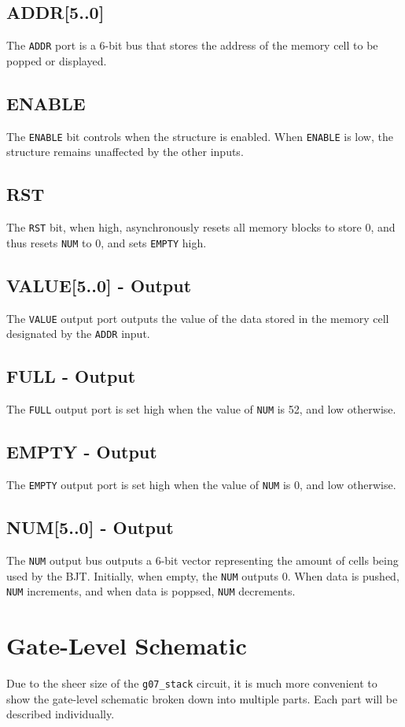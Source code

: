 \documentclass[12pt]{report}
\begin{document}
\section*{ADDR[5..0]}
The \texttt{ADDR} port is a 6-bit bus that stores the address of the memory cell to be popped or
displayed.
\section*{ENABLE}
The \texttt{ENABLE} bit controls when the structure is enabled. When \texttt{ENABLE} is low, the
structure remains unaffected by the other inputs.
\section*{RST}
The \texttt{RST} bit, when high, asynchronously resets all memory blocks to store 0, and thus resets
\texttt{NUM} to 0, and sets \texttt{EMPTY} high.
\section*{VALUE[5..0] - Output}
The \texttt{VALUE} output port outputs the value of the data stored in the memory cell designated by
the \texttt{ADDR} input.
\section*{FULL - Output}
The \texttt{FULL} output port is set high when the value of \texttt{NUM} is 52, and low otherwise.
\section*{EMPTY - Output}
The \texttt{EMPTY} output port is set high when the value of \texttt{NUM} is 0, and low otherwise.
\section*{NUM[5..0] - Output}
The \texttt{NUM} output bus outputs a 6-bit vector representing the amount of cells being used by
the BJT. Initially, when empty, the \texttt{NUM} outputs 0. When data is pushed, \texttt{NUM}
increments, and when data is poppsed, \texttt{NUM} decrements.

\chapter*{Gate-Level Schematic}
Due to the sheer size of the \texttt{g07\_stack} circuit, it is much more convenient to show the
gate-level schematic broken down into multiple parts. Each part will be described individually.
\end{document}
